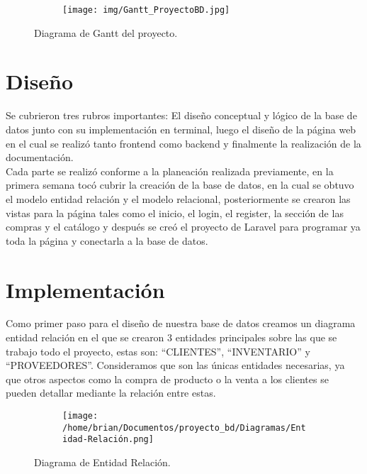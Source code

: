 \documentclass[letterpaper,12pt]{article}
\begin{document}
	\begin{figure}[H]

		\begin{subfigure}{20cm}

			\centering

			\texttt{[image: img/Gantt\_ProyectoBD.jpg]}

		\end{subfigure}

	\caption{Diagrama de Gantt del proyecto.}
	\end{figure}
	
	\section{Diseño}
	
	Se cubrieron tres rubros importantes: El diseño conceptual y lógico de la base de datos junto con su implementación en terminal, luego el diseño de la página web en el cual se realizó tanto frontend como backend y finalmente la realización de la documentación. \\
	
	Cada parte se realizó conforme a la planeación realizada previamente, en la primera semana tocó cubrir la creación de la base de datos, en la cual se  obtuvo el modelo entidad relación y el modelo relacional, posteriormente se crearon las vistas para la página tales como el inicio, el login, el register, la sección de las compras y el catálogo y después se creó el proyecto de Laravel para programar ya toda la página y conectarla a la base de datos.
	
	
	\section{Implementación}
	
	Como primer paso para el diseño de nuestra base de datos creamos un diagrama entidad relación en el que se crearon 3 entidades principales sobre las que se trabajo todo el proyecto, estas son: “CLIENTES”, “INVENTARIO” y “PROVEEDORES”. Consideramos que son las únicas entidades necesarias, ya que otros aspectos como la compra de producto o la venta a los clientes se pueden detallar mediante la relación entre estas.
	
	\begin{figure}[H]

		\begin{subfigure}{20cm}

			\centering

			\texttt{[image: /home/brian/Documentos/proyecto\_bd/Diagramas/Entidad-Relación.png]}

		\end{subfigure}

		\caption{Diagrama de Entidad Relación.}
	\end{figure}
\end{document}
